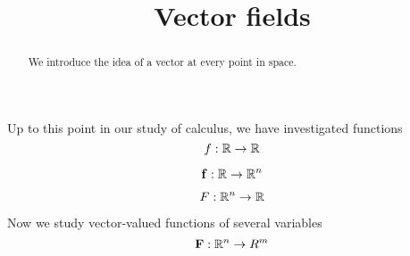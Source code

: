 \documentclass{ximera}
\title[Dig-In:]{Vector fields}
\begin{document}
\begin{abstract}
  We introduce the idea of a vector at every point in space. 
\end{abstract}
\maketitle

Up to this point in our study of calculus, we have investigated functions
\[
f:\mathbb R \to \mathbb R
\]

\[
\mathbf{f}:\mathbb R \to \mathbb R^n
\]

\[
F:\mathbb R^n \to \mathbb R
\]

Now we study vector-valued functions of several variables
\[
\mathbf{F}:\mathbb R^n\to R^m
\]
\end{document}
